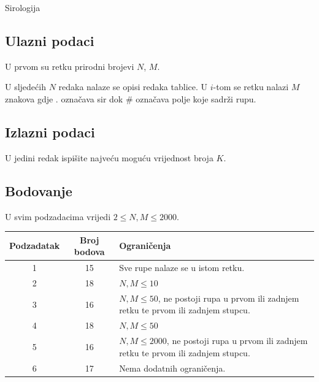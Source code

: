 \begin{statement}[
  problempoints=100,
  timelimit=1 sekunda,
  memorylimit=1024 MiB,
]{Sirologija}
\begin{figure}[!h]
\begin{subfigure}{0.49\linewidth}
    \end{subfigure}

  \end{figure}

\subsection*{Ulazni podaci}

U prvom su retku prirodni brojevi $N$, $M$.

U sljedećih $N$ redaka nalaze se opisi redaka tablice. U $i$-tom se retku nalazi $M$ znakova gdje $\texttt{.}$ označava sir dok $\texttt{\#}$ označava polje koje sadrži rupu. 

\subsection*{Izlazni podaci}

U jedini redak ispišite najveću moguću vrijednost broja $K$.

\subsection*{Bodovanje}

U svim podzadacima vrijedi $2 \leq N, M \leq 2000$.

{\renewcommand{\arraystretch}{1.4}
  \setlength{\tabcolsep}{6pt}
  \begin{tabular}{ccl}
   Podzadatak & Broj bodova & Ograničenja \\ \midrule
    1 & 15 & Sve rupe nalaze se u istom retku. \\
    2 & 18 & $N, M \leq 10$ \\
    3 & 16 & $N, M \leq 50$, ne postoji rupa u prvom ili zadnjem retku te prvom ili zadnjem stupcu.\\
    4 & 18 & $N, M \leq 50$ \\
    5 & 16 & $N, M \leq 2000$, ne postoji rupa u prvom ili zadnjem retku te prvom ili zadnjem stupcu.\\
    6 & 17 & Nema dodatnih ograničenja. \\
\end{tabular}}


\end{statement}
